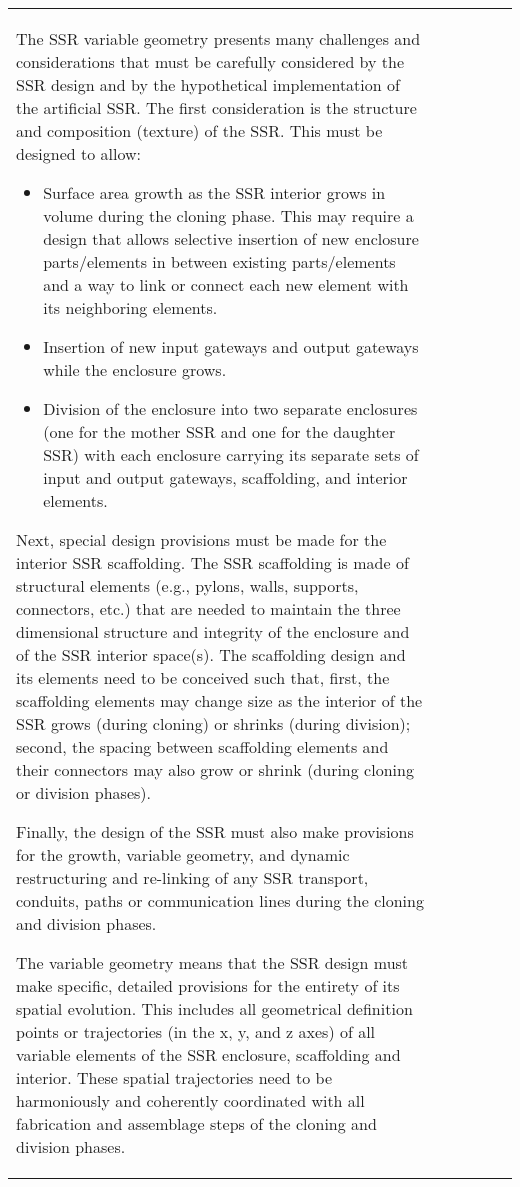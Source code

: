 \begin{table}[h]
\begin{center}
\begin{tabular}{| l l l l l l |}
The SSR variable geometry presents many challenges and considerations that must
be carefully considered by the SSR design and by the hypothetical
implementation of the artificial SSR.  
The first consideration is the structure and composition (texture) of the SSR.  This
must be designed to allow:
\begin{itemize}
\item Surface area growth as the SSR interior grows in volume during the
cloning phase. This may require a design that allows selective
insertion of new enclosure parts/elements in between existing
parts/elements and a way to link or connect each new
element with its neighboring elements.
\item Insertion of new input gateways and output gateways while the enclosure grows.
\item Division of the enclosure into two separate enclosures (one for
the mother SSR and one for the daughter SSR)  with each enclosure
carrying its separate sets of input and output gateways, 
scaffolding, and interior elements.
\end{itemize}

Next, special design provisions must be made for the interior SSR
scaffolding. The SSR scaffolding is made of structural
elements (e.g., pylons, walls, supports, connectors, etc.) that are needed to
maintain the three dimensional structure and integrity of the enclosure
and of the SSR interior space(s). The scaffolding design and its
elements need to be conceived such that, first, the scaffolding elements may
change size as the
interior of the SSR grows (during cloning) or shrinks (during division);
second, the spacing between scaffolding elements and their connectors may
also grow or shrink (during cloning or division phases).

Finally, the design of the SSR must also make provisions for the growth,
variable geometry, and dynamic restructuring and re-linking of any SSR
transport, conduits, paths or communication lines during the cloning
and division phases.

The variable geometry means that the SSR design must make specific,
detailed provisions for the entirety of its spatial evolution. This includes all geometrical
definition points or trajectories (in the x, y, and z axes) of all variable
elements of the SSR enclosure, scaffolding and interior. These spatial
trajectories need to be harmoniously and coherently coordinated with
all fabrication and assemblage steps of the cloning and division
phases.
\index{self-replication!growth and development|)}


\end{tabular}
\end{center}
\end{table}

